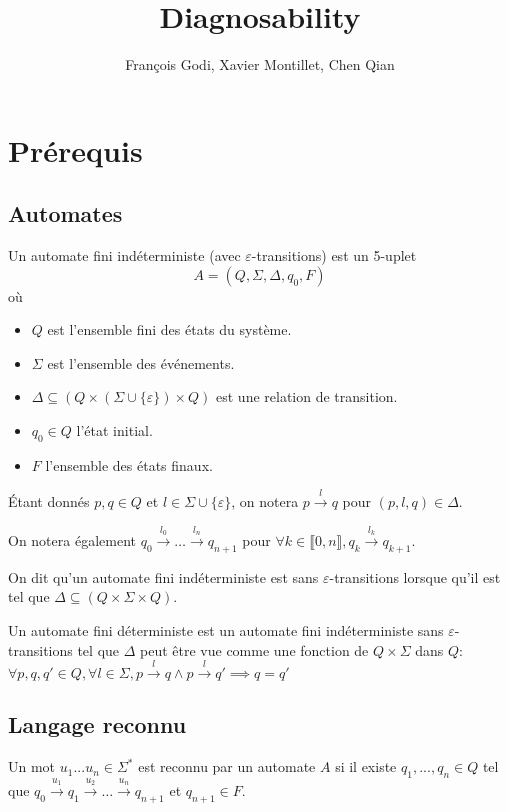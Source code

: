 \documentclass[10pt,a4paper]{article}
\newcommand{\enum}[2]{\llbracket #1, #2 \rrbracket}
\begin{document}
    \title{Diagnosability}

    \author{François Godi, Xavier Montillet, Chen Qian}

\section{Pr\'erequis}

\subsection{Automates}

Un automate fini indéterministe (avec $\varepsilon$-transitions) est un 5-uplet
$$A = (Q, \Sigma, \Delta, q_0, F)$$
o\`u
\begin{itemize}
	\item $Q$ est l'ensemble fini des états du système.
	\item $\Sigma$ est l'ensemble des événements.
	\item $\Delta \subseteq (Q \times (\Sigma \cup \{\varepsilon\}) \times Q)$ est une relation de transition.
	\item $q_0 \in Q$ l'état initial.
	\item $F$ l'ensemble des \'etats finaux.
\end{itemize}

\'Etant donn\'es $p,q \in Q$ et $l\in \Sigma \cup \{\varepsilon\}$, on notera $p \overset{l}{{\to}}q$ pour $(p,l,q) \in \Delta$.

On notera \'egalement $q_0 \overset{l_0}{{\to}} \dots \overset{l_n}{{\to}} q_{n+1}$ pour $\forall k \in \enum{0}{n}, q_k \overset{l_k}{{\to}} q_{k+1}$.



On dit qu'un automate fini ind\'eterministe est sans $\varepsilon$-transitions lorsque qu'il est tel que  $\Delta \subseteq (Q\times \Sigma \times Q)$.

Un automate fini d\'eterministe est un automate fini ind\'eterministe sans $\varepsilon$-transitions tel que $\Delta$ peut \^etre vue comme une fonction de $Q\times \Sigma$ dans $Q$: $\forall p,q,q' \in Q, \forall l \in \Sigma, p\overset{l}{{\to}}q \land p\overset{l}{{\to}}q' \implies q=q'$

\subsection{Langage reconnu}

Un mot $u_1...u_n \in \Sigma^*$ est reconnu par un automate $A$ si il existe $q_1,...,q_n \in Q$ tel que $q_0 \overset{u_1}{{\to}} q_1 \overset{u_2}{{\to}} \dots \overset{u_n}{{\to}} q_{n+1}$ et $q_{n+1} \in F$.
\end{document}
